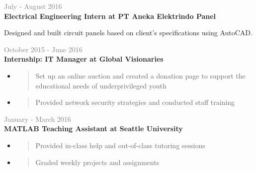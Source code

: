 \documentclass[letterpage]{article}
\begin{document}
\begin{minipage}[t]{0.63\linewidth}
\vspace{7px}
\textcolor{gray}{July - August 2016}\\
\textbf{\textsf{Electrical Engineering Intern
at PT Aneka Elektrindo Panel}}\\
\raggedright
Designed and built circuit panels based on client's
specifications using AutoCAD.

\vspace{7px}
\textcolor{gray}{October 2015 - June 2016}\\
\textbf{\textsf{Internship: IT Manager at Global Visionaries}}\\
\begin{itemize}[leftmargin=*,labelindent=1mm,labelsep=0mm]
\item
  \begin{quote}
  \raggedright
  Set up an online auction and created a donation page to
  support the educational needs of underprivileged youth
  \end{quote}
\item
  \begin{quote}
  \raggedright
  Provided network security strategies and conducted staff
  training
  \end{quote}
\end{itemize}

\vspace{7px}
\textcolor{gray}{January - March 2016}\\
\textbf{\textsf{MATLAB Teaching Assistant at Seattle University}}
\begin{itemize}[leftmargin=*,labelindent=1mm,labelsep=0mm]
\item
  \begin{quote}
  \raggedright
  Provided in-class help and out-of-class tutoring sessions
  \end{quote}
\item
  \begin{quote}
  \raggedright
  Graded weekly projects and assignments
  \end{quote}
\end{itemize}

\end{minipage}
\end{document}
